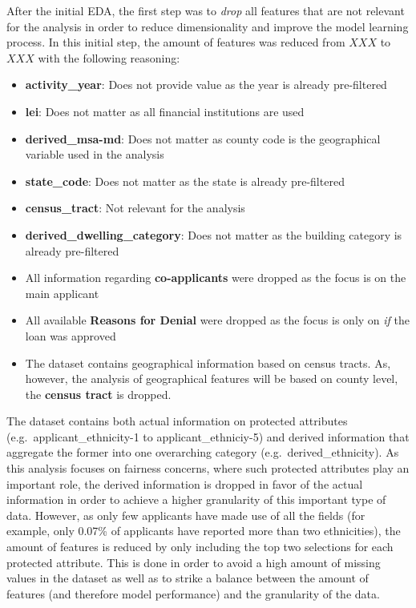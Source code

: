 After the initial EDA, the first step was to \textit{drop} all features that are not relevant for the analysis in order to reduce dimensionality and improve the model learning process. \@ 
In this initial step, the amount of features was reduced from $XXX$ to $XXX$ with the following reasoning:
\begin{itemize}
    \item \textbf{activity\_year}: Does not provide value as the year is already pre-filtered
    \item \textbf{lei}: Does not matter as all financial institutions are used
    \item \textbf{derived\_msa-md}: Does not matter as county code is the geographical variable used in the analysis
    \item \textbf{state\_code}: Does not matter as the state is already pre-filtered
    \item \textbf{census\_tract}: Not relevant for the analysis
    \item \textbf{derived\_dwelling\_category}: Does not matter as the building category is already pre-filtered
    \item All information regarding \textbf{co-applicants} were dropped as the focus is on the main applicant
    \item All available \textbf{Reasons for Denial} were dropped as the focus is only on \textit{if} the loan was approved
    \item The dataset contains geographical information based on census tracts. As, however, the analysis of geographical features will be based on county level, the \textbf{census tract} is dropped.
\end{itemize}

The dataset contains both actual information on protected attributes (e.g.\ \mbox{applicant\_ethnicity-1} to \mbox{applicant\_ethniciy-5}) and derived information that aggregate the former into one overarching category (e.g.\ \mbox{derived\_ethnicity}). 
As this analysis focuses on fairness concerns, where such protected attributes play an important role, the derived information is dropped in favor of the actual information in order to achieve a higher granularity of this important type of data.  
However, as only few applicants have made use of all the fields (for example, only 0.07\% of applicants have reported more than two ethnicities), the amount of features is reduced by only including the top two selections for each protected attribute. 
This is done in order to avoid a high amount of missing values in the dataset as well as to strike a balance between the amount of features (and therefore model performance) and the granularity of the data.


